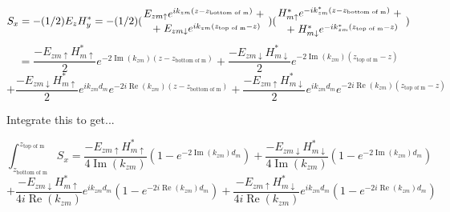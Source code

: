 \documentclass[12pt]{article}
\newcommand{\stack}[2]{\genfrac{}{}{0pt}{}{#1}{#2}}
\renewcommand{\(}{\left(}
\renewcommand{\)}{\right)}
\renewcommand{\Re}{\operatorname{Re}}
\renewcommand{\Im}{\operatorname{Im}}
\begin{document}
$$S_x = -(1/2)E_z H_y^* = -(1/2) (\stack{E_{zm\uparrow} e^{i k_{zm} (z-z_{\text{bottom of m}})} \; + \; }{\; + \; E_{zm\downarrow} e^{i k_{zm} (z_{\text{top of m}} - z)}})(\stack{H_{m\uparrow}^* e^{-i k_{zm}^* (z-z_{\text{bottom of m}})} \; + \; }{\; + \; H_{m\downarrow}^* e^{-i k_{zm}^* (z_{\text{top of m}} - z)}})$$
$$= \frac{-E_{zm\uparrow}H_{m\uparrow}^*}{2}e^{-2 \Im(k_{zm})(z-z_{\text{bottom of m}})} + \frac{-E_{zm\downarrow}H_{m\downarrow}^*}{2}e^{-2 \Im(k_{zm})(z_{\text{top of m}}-z)}$$
$$ + \frac{-E_{zm\downarrow}H_{m\uparrow}^*}{2} e^{ik_{zm} d_m}e^{-2i\Re(k_{zm})(z-z_{\text{bottom of m}})} + \frac{-E_{zm\uparrow}H_{m\downarrow}^*}{2} e^{ik_{zm} d_m}e^{-2i\Re(k_{zm})(z_{\text{top of m}}-z)}$$

Integrate this to get...

$$\int_{z_{\text{bottom of m}}}^{z_{\text{top of m}}} S_x = \frac{-E_{zm\uparrow}H_{m\uparrow}^*}{4 \Im(k_{zm})}(1-e^{-2\Im(k_{zm})d_m}) + \frac{-E_{zm\downarrow}H_{m\downarrow}^*}{4 \Im(k_{zm})}(1-e^{-2\Im(k_{zm})d_m})$$
$$ + \frac{-E_{zm\downarrow}H_{m\uparrow}^*}{4i\Re(k_{zm})} e^{i k_{zm} d_m} (1 - e^{-2i\Re(k_{zm})d_m}) + \frac{-E_{zm\uparrow}H_{m\downarrow}^*}{4i \Re(k_{zm})} e^{ik_{zm} d_m}(1 - e^{-2i\Re(k_{zm})d_m})$$
\end{document}
